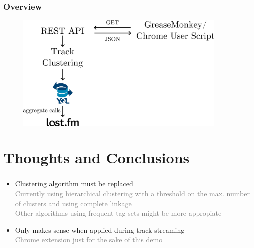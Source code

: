\documentclass[slidestop,compress,mathserif,serif,notes=show]{beamer}
\begin{document}
  
  \begin{frame}
    \frametitle{Overview}
    \vspace{0.5cm}
    \begin{figure}
      \centering 
      \includegraphics[width=0.9\textwidth]{figs/diagram.pdf} 
      \label{fig:diagram} 
    \end{figure}
  \end{frame}


  \section{Thoughts and Conclusions}
  \begin{frame}
    \frametitle{\secname{}}
    \vspace{1cm}
    \begin{itemize}
      \item{}
      Clustering algorithm must be replaced\\
      \textcolor{gray}{Currently using hierarchical clustering with a threshold on the
      max. number of clusters and using complete linkage\\
      Other algorithms using frequent tag sets might be more appropiate}
      \item{}
      Only makes sense when applied during track streaming\\
      \textcolor{gray}{Chrome extension just for the sake of this demo}
    \end{itemize}
  \end{frame}
\end{document}
